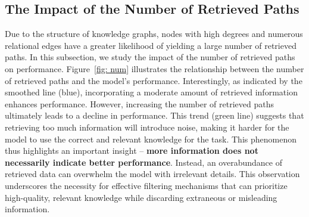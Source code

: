 \documentclass[11pt]{article}
\newcommand{\jt}[1]{{\color{red}[JT:#1]}}
\newcommand{\kai}[1]{{\color{blue}[Kai:#1]}}
\newcommand{\yu}[1]{{\color{brown}[yu:#1]}}
\begin{document}


\subsection{The Impact of the Number of Retrieved Paths}


Due to the structure of knowledge graphs, nodes with high degrees and numerous relational edges have a greater likelihood of yielding a large number of retrieved paths.
In this subsection, we study the impact of the number of retrieved paths on performance.
Figure~\ref{fig: num} illustrates the relationship between the number of retrieved paths and the model’s performance. Interestingly, as indicated by the smoothed line (blue), incorporating a moderate amount of retrieved information enhances performance. However, increasing the number of retrieved paths ultimately leads to a decline in performance. This trend (green line) suggests that retrieving too much information will introduce noise, making it harder for the model to use the correct and relevant knowledge for the task. This phenomenon thus highlights an important insight -- {\bf more information does not necessarily indicate better performance}. Instead, an overabundance of retrieved data can overwhelm the model with irrelevant details. 
This observation underscores the necessity for effective filtering mechanisms that can prioritize high-quality, relevant knowledge while discarding extraneous or misleading information.


\end{document}
